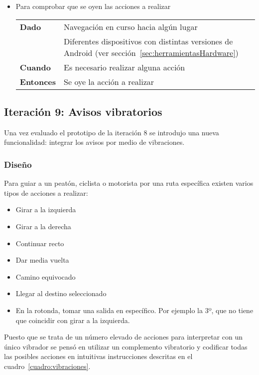 \begin{itemize}
  \item Para comprobar que se oyen las acciones a realizar

  \begin{tabular}{p{}p{}}
    \hline
    \textbf{Dado}     & Navegación en curso hacia algún lugar \\
                      & Diferentes dispositivos con distintas versiones de Android (ver
                        sección~\ref{sec:herramientasHardware}) \\
    \textbf{Cuando}   & Es necesario realizar alguna acción \\
    \textbf{Entonces} & Se oye la acción a realizar \\
    \hline
  \end{tabular}
\end{itemize}

\subsection{Iteración 9: Avisos vibratorios}
\label{sec:ite9}

Una vez evaluado el prototipo de la iteración 8 se introdujo una nueva funcionalidad: integrar los
avisos por medio de vibraciones.

\subsubsection{Diseño}

Para guiar a un peatón, ciclista o motorista por una ruta específica existen varios tipos de
acciones a realizar:

\begin{itemize}
  \item Girar a la izquierda
  \item Girar a la derecha
  \item Continuar recto
  \item Dar media vuelta
  \item Camino equivocado
  \item Llegar al destino seleccionado
  \item En la rotonda, tomar una salida en específico. Por ejemplo la 3º, que no tiene que coincidir
    con girar a la izquierda.
\end{itemize}

Puesto que se trata de un número elevado de acciones para interpretar con un único vibrador se pensó
en utilizar un complemento vibratorio y codificar todas las posibles acciones en intuitivas
instrucciones descritas en el cuadro~\ref{cuadro:vibraciones}.


